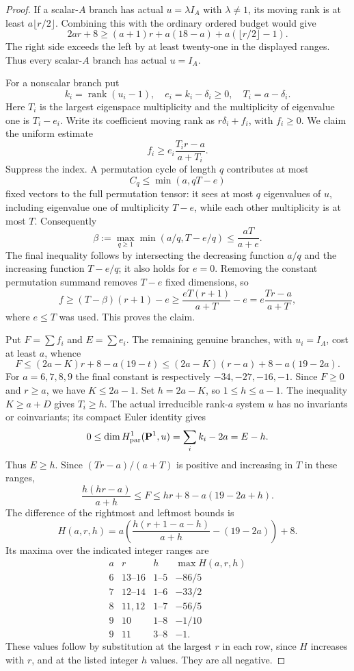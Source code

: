 \documentclass[11pt]{article}
\theoremstyle{definition}
\theoremstyle{remark}
\begin{document}
\begin{proof}
If a scalar-$A$ branch has actual $u=\lambda I_A$ with
$\lambda\ne1$, its moving rank is at least
$a\lfloor r/2\rfloor$. Combining this with the ordinary
ordered budget would give
\[
 2ar+8\geq(a+1)r+a(18-a)+a(\lfloor r/2\rfloor-1).
\]
The right side exceeds the left by at least twenty-one in
the displayed ranges. Thus every scalar-$A$ branch has
actual $u=I_A$.

For a nonscalar branch put
\[
 k_i=\operatorname{rank}(u_i-1),\quad
 e_i=k_i-\delta_i\geq0,\quad T_i=a-\delta_i.
\]
Here $T_i$ is the largest eigenspace multiplicity and the
multiplicity of eigenvalue one is $T_i-e_i$.
Write its coefficient moving rank as $r\delta_i+f_i$, with
$f_i\geq0$. We claim the uniform estimate
\begin{equation}\label{eq:primitive-tensor-spectral}
                  f_i\geq e_i\frac{T_i r-a}{a+T_i}.
\end{equation}
Suppress the index. A permutation cycle of length $q$
contributes at most
\[
 C_q\leq\min(a,qT-e)
\]
fixed vectors to the full permutation tensor: it sees at most
$q$ eigenvalues of $u$, including eigenvalue one of multiplicity
$T-e$, while each other multiplicity is at most $T$.
Consequently
\[
 \beta:=\max_{q\geq1}\min(a/q,T-e/q)
            \leq\frac{aT}{a+e}.
\]
The final inequality follows by intersecting the decreasing
function $a/q$ and the increasing function $T-e/q$; it also
holds for $e=0$. Removing the constant permutation summand
removes $T-e$ fixed dimensions, so
\[
 f\geq(T-\beta)(r+1)-e
   \geq\frac{eT(r+1)}{a+T}-e
   =e\frac{Tr-a}{a+T},
\]
where $e\leq T$ was used. This proves the claim.

Put $F=\sum f_i$ and $E=\sum e_i$. The remaining genuine
branches, with $u_i=I_A$, cost at least $a$, whence
\[
 F\leq(2a-K)r+8-a(19-t)
   \leq(2a-K)(r-a)+8-a(19-2a).
\]
For $a=6,7,8,9$ the final constant is respectively
$-34,-27,-16,-1$. Since $F\geq0$ and $r\geq a$, we have
$K\leq2a-1$. Set $h=2a-K$, so $1\leq h\leq a-1$.
The inequality $K\geq a+D$ gives $T_i\geq h$.
The actual irreducible rank-$a$ system $u$ has no invariants
or coinvariants; its compact Euler identity gives
\[
 0\leq\dim H^1_{\rm par}(\mathbf P^1,u)
        =\sum_i k_i-2a=E-h.
\]
Thus $E\geq h$. Since $(Tr-a)/(a+T)$ is positive and
increasing in $T$ in these ranges,
\[
 \frac{h(hr-a)}{a+h}\leq F
                \leq hr+8-a(19-2a+h).
\]
The difference of the rightmost and leftmost bounds is
\[
 H(a,r,h)=a\left(\frac{h(r+1-a-h)}{a+h}-(19-2a)\right)+8.
\]
Its maxima over the indicated integer ranges are
\[
\begin{array}{c|c|c|c}
 a&r&h&\max H(a,r,h)\\\hline
 6&13\text{--}16&1\text{--}5&-86/5\\
 7&12\text{--}14&1\text{--}6&-33/2\\
 8&11,12&1\text{--}7&-56/5\\
 9&10&1\text{--}8&-1/10\\
 9&11&3\text{--}8&-1.
\end{array}
\]
These values follow by substitution at the largest $r$ in
each row, since $H$ increases with $r$, and at the listed
integer $h$ values. They are all negative.


\end{proof}
\end{document}
